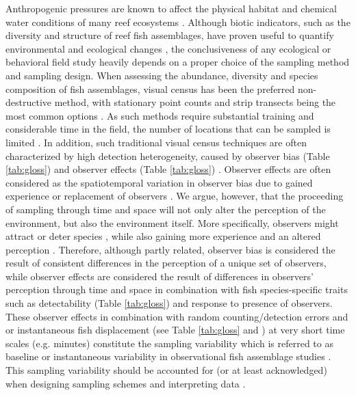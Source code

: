 \documentclass[10pt,letterpaper]{article}
\begin{document}
Anthropogenic pressures are known to affect the physical habitat and chemical water conditions of many reef ecosystems \cite{Halpern2007}. Although biotic indicators, such as the diversity and structure of reef fish assemblages, have proven useful to quantify environmental and ecological changes \cite{Ford2018,Gonzalez-Sanson2010,Guillemot2014}, the conclusiveness of any ecological or behavioral field study heavily depends on a proper choice of the sampling method and sampling design. When assessing the abundance, diversity and species composition of fish assemblages, visual census has been the preferred non-destructive method, with stationary point counts and strip transects being the most common options \cite{Caldwell2016,Denny2003,Jones2015a}. As such methods require substantial training and considerable time in the field, the number of locations that can be sampled is limited \cite{Thompson1997}. In addition, such traditional visual census techniques are often characterized by high detection heterogeneity, caused by observer bias (Table \ref{tab:gloss}) and observer effects (Table \ref{tab:gloss}) \cite{Dickens2011,Langlois2010,Lindfield2014,McCormick1987EstimatingStrip-transects,Pais2017,Willis2000,Willis2001}. Observer effects are often considered as the spatiotemporal variation in observer bias due to gained experience or replacement of observers \cite{Thompson1997}. We argue, however, that the proceeding of sampling through time and space will not only alter the perception of the environment, but also the environment itself. More specifically, observers might attract or deter species \cite{Kulbicki1998,Usseglio2015QuantifyingApproaches}, while also gaining more experience and an altered perception \cite{Williams2006}. Therefore, although partly related, observer bias is considered the result of consistent differences in the perception of a unique set of observers, while observer effects are considered the result of differences in observers' perception through time and space in combination with fish species-specific traits such as detectability (Table \ref{tab:gloss}) and response to presence of observers. These observer effects in combination with random counting/detection errors and  or instantaneous fish displacement (see Table \ref{tab:gloss} and ) at very short time scales (e.g. minutes) constitute the sampling variability which is referred to as baseline or instantaneous variability in observational fish assemblage studies \cite{McClanahan2007,Irigoyen2013VariabilityCensus}. This sampling variability should be accounted for (or at least acknowledged) when designing sampling schemes and interpreting data \cite{McClanahan2007,Irigoyen2013VariabilityCensus}. 
\end{document}
